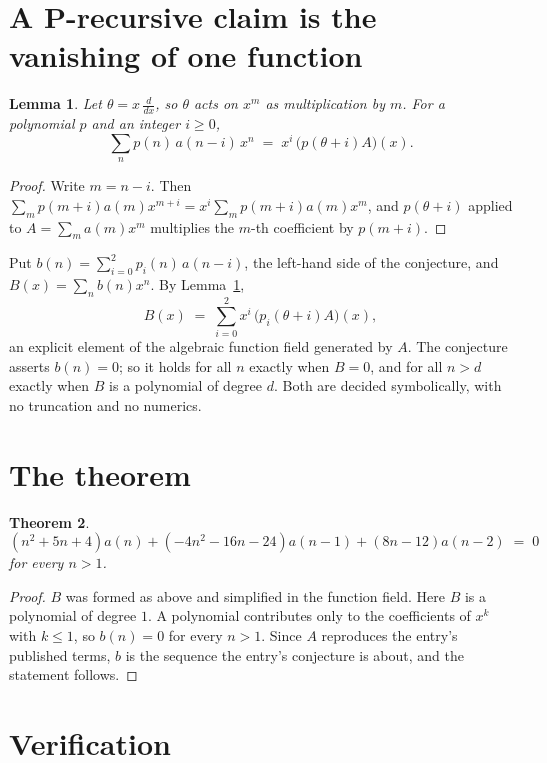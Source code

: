 \documentclass[11pt,a4paper]{article}
\theoremstyle{plain}
\newtheorem{theorem}{Theorem}
\newtheorem{lemma}[theorem]{Lemma}
\theoremstyle{definition}
\begin{document}
\section{A P-recursive claim is the vanishing of one function}

\begin{lemma}\label{lem:theta}
Let $\theta=x\,\frac{d}{dx}$, so $\theta$ acts on $x^m$ as multiplication by $m$. For a
polynomial $p$ and an integer $i\ge0$,
\[
\sum_{n} p(n)\,a(n-i)\,x^{n}\;=\;x^{i}\,\bigl(p(\theta+i)A\bigr)(x).
\]
\end{lemma}

\begin{proof}
Write $m=n-i$. Then $\sum_m p(m+i)a(m)x^{m+i}=x^i\sum_m p(m+i)a(m)x^m$, and $p(\theta+i)$
applied to $A=\sum_m a(m)x^m$ multiplies the $m$-th coefficient by $p(m+i)$.
\end{proof}

Put $b(n)=\sum_{i=0}^{2}p_i(n)\,a(n-i)$, the left-hand side of the conjecture, and
$B(x)=\sum_n b(n)x^n$. By Lemma~\ref{lem:theta},
\[
B(x)\;=\;\sum_{i=0}^{2}x^{i}\,\bigl(p_i(\theta+i)A\bigr)(x),
\]
an explicit element of the algebraic function field generated by $A$. The conjecture asserts
$b(n)=0$; so it holds for all $n$ exactly when $B=0$, and for all $n>d$ exactly when $B$ is a
polynomial of degree $d$. Both are decided symbolically, with no truncation and no numerics.

\section{The theorem}

\begin{theorem}
\[
\left(n^{2} + 5 n + 4\right)a(n) + \left(- 4 n^{2} - 16 n - 24\right)a(n-1) + \left(8 n - 12\right)a(n-2)\;=\;0
\]
for every $n>1$.
\end{theorem}

\begin{proof}
$B$ was formed as above and simplified in the function field. Here $B$ is a polynomial of degree $1$. A polynomial contributes only to the coefficients of $x^k$ with $k\le1$, so $b(n)=0$ for every $n>1$. Since $A$ reproduces the
entry's published terms, $b$ is the sequence the entry's conjecture is about, and the statement
follows.
\end{proof}

\section{Verification}
\end{document}
